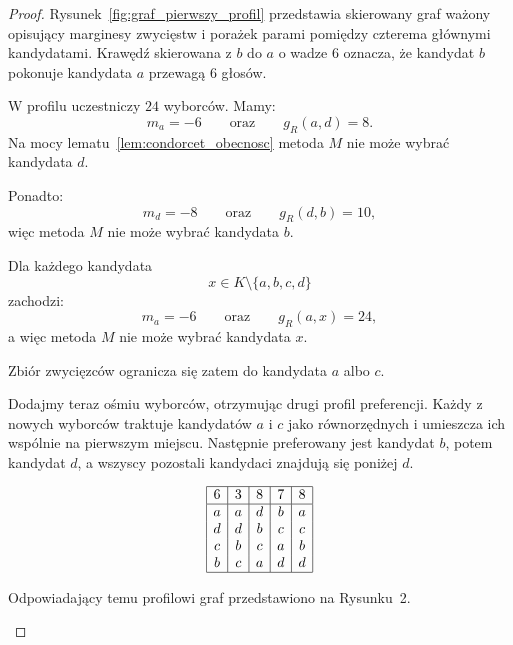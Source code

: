 \documentclass[12pt,a4paper]{mwrep}
\begin{document}
\begin{proof}
		Rysunek~\ref{fig:graf_pierwszy_profil} przedstawia skierowany graf ważony opisujący marginesy zwycięstw i porażek parami pomiędzy czterema głównymi kandydatami. Krawędź skierowana z \(b\) do \(a\) o wadze \(6\) oznacza, że kandydat \(b\) pokonuje kandydata \(a\) przewagą \(6\) głosów.
		
		W profilu uczestniczy \(24\) wyborców. Mamy:
		\[
		m_a = -6
		\qquad \text{oraz} \qquad
		g_R(a,d)=8.
		\]
		Na mocy lematu~\ref{lem:condorcet_obecnosc} metoda \(M\) nie może wybrać kandydata \(d\).
		
		Ponadto:
		\[
		m_d = -8
		\qquad \text{oraz} \qquad
		g_R(d,b)=10,
		\]
		więc metoda \(M\) nie może wybrać kandydata \(b\).
		
		Dla każdego kandydata
		\[
		x \in K \setminus \{a,b,c,d\}
		\]
		zachodzi:
		\[
		m_a=-6
		\qquad \text{oraz} \qquad
		g_R(a,x)=24,
		\]
		a więc metoda \(M\) nie może wybrać kandydata \(x\).
		
		Zbiór zwycięzców ogranicza się zatem do kandydata \(a\) albo \(c\).
		
		Dodajmy teraz ośmiu wyborców, otrzymując drugi profil preferencji. Każdy z nowych wyborców traktuje kandydatów \(a\) i \(c\) jako równorzędnych i umieszcza ich wspólnie na pierwszym miejscu. Następnie preferowany jest kandydat \(b\), potem kandydat \(d\), a wszyscy pozostali kandydaci znajdują się poniżej \(d\).
		
		\begin{table}[H]
			\centering
			\[
			\begin{array}{|c|c|c|c|c|}
				\hline
				6 & 3 & 8 & 7 & 8\\
				\hline
				a & a & d & b & a \\
				d & d & b & c & c \\
				c & b & c & a & b \\
				b & c & a & d & d \\
				\hline
			\end{array}
			\]
			\caption{Drugi profil preferencji (z dodanymi ośmioma wyborcami)}
			\label{tab:drugi_profil}
		\end{table}
		
		Odpowiadający temu profilowi graf przedstawiono na Rysunku~2.
		
		\begin{figure}[H]
			\centering
			
			\begin{tikzpicture}[
				>=stealth,
				thick,
				vertex/.style={circle, draw, minimum size=1.2cm},
				edge label/.style={draw=none, fill=none, inner sep=1pt}
				]
				

\end{tikzpicture}
\end{figure}
\end{proof}
\end{document}
